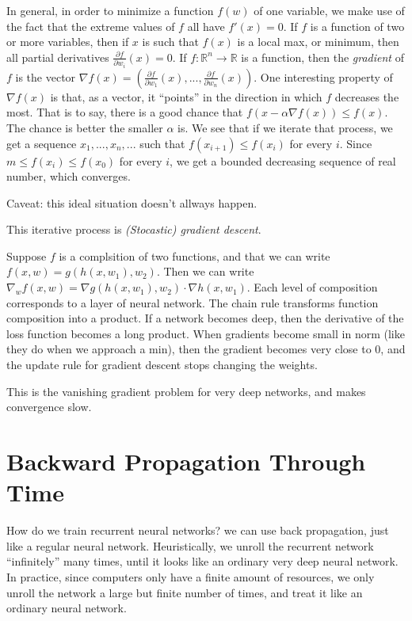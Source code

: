 \documentclass[10pt]{amsart}
\newcommand{\R}{\mathbb{R}}
\theoremstyle{definition}
\begin{document}
In general, in order to minimize a function $f(w)$ of one variable, we make use of the fact that the extreme values of $f$ all have $f'(x)=0$.  If $f$ is a function of two or more variables, then if $x$ is such that $f(x)$ is a local max, or minimum, then all partial derivatives $\frac{\partial f}{\partial w_i}(x)=0$.  If $f:\R^n\to\R$ is a function, then the {\em gradient} of $f$ is the vector $\nabla f(x) = \left(\frac{\partial f}{\partial w_1}(x),...,\frac{\partial f}{\partial w_n}(x)\right)$. One interesting property of $\nabla f(x)$ is that, as a vector, it ``points'' in the direction in which $f$ decreases the most.  That is to say, there is a good chance that $f(x-\alpha\nabla f(x))\leq f(x)$. The chance is better the smaller $\alpha$ is.  We see that if we iterate that process, we get a sequence $x_1,...,x_n,...$ such that $f(x_{i+1})\leq f(x_i)$ for every $i$.  Since $m\leq f(x_i)\leq f(x_0)$ for every $i$, we get a bounded decreasing sequence of real number, which converges.

Caveat: this ideal situation doesn't allways happen.

This iterative process is {\em (Stocastic) gradient descent}.

Suppose $f$ is a complsition of two functions, and that we can write $f(x,w)= g(h(x, w_1), w_2)$.
Then we can write $\nabla_w f(x, w)=\nabla g(h(x, w_1), w_2)\cdot \nabla h(x, w_1)$. Each level
of composition corresponds to a layer of neural network.  The chain rule transforms function composition
into a product. If a network becomes deep, then the derivative of the loss function becomes a long
product.  When gradients become small in norm (like they do when we approach a min), then the gradient
becomes very close to $0$, and the update rule for gradient descent stops changing the weights.

This is the vanishing gradient problem for very deep networks, and makes convergence slow.


\section{Backward Propagation Through Time}

How do we train recurrent neural networks? we can use back propagation, just like a regular neural network. Heuristically, we unroll the recurrent network ``infinitely'' many times, until it looks like an ordinary very deep neural network.  In practice, since computers only have a finite amount of resources, we only unroll the network a large but finite number of times, and treat it like an ordinary neural network.
\end{document}
